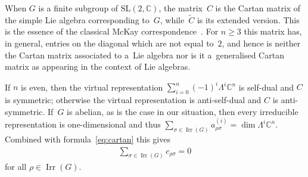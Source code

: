\documentclass[pdftex]{sigma}
\numberwithin{equation}{section}
\newcommand{\C}{{\mathbb C}}
\newcommand{\SL}{\mathrm{SL}}
\newcommand{\Irr}{\operatorname{Irr}}
\begin{document}
\begin{Remark}
  When $G$ is a f\/inite subgroup of $\SL(2,\C)$, the matrix~$C$ is the
  Cartan matrix of the simple Lie algebra corresponding to~$G$, while~$\tilde{C}$ is its extended version.  This is the essence of the classical
  McKay correspondence~\cite{McKay1980}.  For $n\geq 3$ this matrix has, in general, entries on the diagonal which are not equal to~$2$, and hence is
  neither the Cartan matrix associated to a~Lie algebra nor is it a~generalised Cartan matrix as appearing in the context of Lie
  algebras.
\end{Remark}

If $n$ is even, then the virtual representation $\sum\limits_{i=0}^n(-1)^i
\Lambda^i \C^n$ is self-dual and $C$ is symmetric; otherwise the
virtual representation is anti-self-dual and $C$ is anti-symmetric.
If~$G$ is abelian, as is the case in our situation, then every
irreducible representation is one-dimensional and thus $\sum\limits_{\sigma
  \in \Irr(G)} a_{\rho\sigma}^{(i)} = \dim  \Lambda^i\C^n$.  Combined
with formula~\eqref{eq:cartan} this gives
\begin{gather}\label{eq:c}
  \sum_{\sigma \in \Irr(G)} c_{\rho\sigma} = 0
\end{gather}
for all $\rho \in \Irr(G)$.
\end{document}

